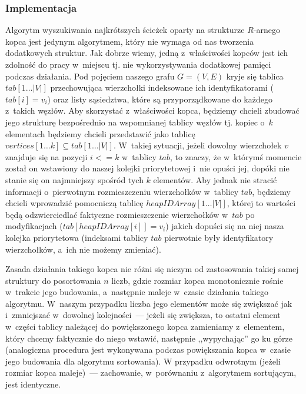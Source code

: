 \subsubsection{Implementacja}


Algorytm wyszukiwania najkrótszych ścieżek oparty na strukturze $R$-arnego kopca jest jedynym algorytmem, który nie wymaga od nas tworzenia dodatkowych struktur.
Jak dobrze wiemy, jedną z~właściwości kopców jest ich zdolność do pracy w~miejscu tj. nie wykorzystywania dodatkowej pamięci podczas działania.
Pod pojęciem naszego grafu $G = \left( V, E \right)$ kryje się tablica $tab \left[ 1 \dots \left| V\right| \right]$ przechowująca wierzchołki indeksowane ich identyfikatorami ($tab[i]=v_{i}$) oraz listy sąsiedztwa, które są przyporządkowane do każdego z~takich węzłów.
Aby skorzystać z~właściwości kopca, będziemy chcieli zbudować jego strukturę bezpośrednio na wspomnianej tablicy węzłów tj. kopiec o~$k$ elementach będziemy chcieli przedstawić jako tablicę $vertices \left[ 1 \dots k \right] \subseteq tab \left[ 1 \dots \left| V\right| \right]$.
W~takiej sytuacji, jeżeli dowolny wierzchołek $v$ znajduje się na pozycji $i <= k $ w~tablicy $tab$, to znaczy, że w~którymś momencie został on wstawiony do naszej kolejki priorytetowej i~nie opuści jej, dopóki nie stanie się on najmniejszy spośród tych $k$ elementów.
Aby jednak nie stracić informacji o~pierwotnym rozmieszczeniu wierzchołków w~tablicy $tab$, będziemy chcieli wprowadzić pomocniczą tablicę $heapIDArray \left[ 1 \dots \left| V\right| \right]$, której to wartości będą odzwierciedlać faktyczne rozmieszczenie wierzchołków w~$tab$ po modyfikacjach ($tab \left[ heapIDArray \left[ i \right] \right] = v_{i}$) jakich dopuści się na niej nasza kolejka priorytetowa (indeksami tablicy $tab$ pierwotnie były identyfikatory wierzchołków, a~ich nie możemy zmieniać).

Zasada działania takiego kopca nie różni się niczym od zastosowania takiej samej struktury do posortowania $n$ liczb, gdzie rozmiar kopca monotonicznie rośnie w~trakcie jego budowania, a~następnie maleje w~czasie działania takiego algorytmu.
W~naszym przypadku liczba jego elementów może się zwiększać jak i~zmniejszać w~dowolnej kolejności~--- jeżeli się zwiększa, to ostatni element w~części tablicy należącej do powiększonego kopca zamieniamy z~elementem, który chcemy faktycznie do niego wstawić, następnie ,,wypychając'' go ku górze (analogiczna procedura jest wykonywana podczas powiększania kopca w~czasie jego budowania dla algorytmu sortowania).
W przypadku odwrotnym (jeżeli rozmiar kopca maleje)~--- zachowanie, w~porównaniu z~algorytmem sortującym, jest identyczne.

